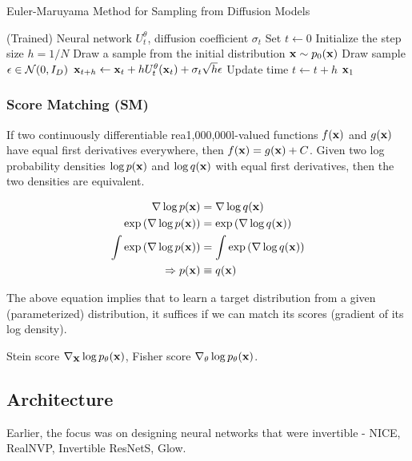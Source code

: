 \documentclass[a4paper, 11pt]{article}
\begin{document}
\begin{algorithm}
    \caption{Euler-Maruyama Method for Sampling from Diffusion Models \citep{sarkka2019applied}}\label{alg:diff_sample}
    \begin{algorithmic}[1]
    \Require (Trained) Neural network $U_t^{\theta}$, diffusion coefficient $\sigma_t$
    \State Set $t \gets 0$
    \State Initialize the step size $h = 1 / N$
    \State Draw a sample from the initial distribution $\mbox{$\mbox{$\mathbf{x}$}$} \sim p_0(\mbox{$\mbox{$\mathbf{x}$}$})$
    \State Draw sample $\epsilon \in \mbox{$\cal N$}(0, I_D)$
    \State $\mbox{$\mbox{$\mathbf{x}$}$}_{t+h} \gets \mbox{$\mbox{$\mathbf{x}$}$}_t + h U_t^{\theta}(\mbox{$\mbox{$\mathbf{x}$}$}_t) + \sigma_t \sqrt{h}\epsilon$
    \State Update time $t \gets t + h$
    \EndFor
    \State \Return $\mbox{$\mbox{$\mathbf{x}$}$}_1$
    \end{algorithmic}
\end{algorithm}


\subsubsection{Score Matching (SM)}
If two continuously differentiable rea1,000,000l-valued functions $f(\mbox{$\mbox{$\mathbf{x}$}$})$ and $g(\mbox{$\mbox{$\mathbf{x}$}$})$ have equal first derivatives everywhere, then $f(\mbox{$\mbox{$\mathbf{x}$}$}) = g(\mbox{$\mbox{$\mathbf{x}$}$}) + C$. Given two log probability densities $\log p(\mbox{$\mbox{$\mathbf{x}$}$})$ and $\log q(\mbox{$\mbox{$\mathbf{x}$}$})$ with equal first derivatives, then the two densities are equivalent.

\begin{align}
    \nabla \log p(\mbox{$\mbox{$\mathbf{x}$}$}) &= \nabla \log q(\mbox{$\mbox{$\mathbf{x}$}$}) \\ 
    \exp \left (\nabla \log p(\mbox{$\mbox{$\mathbf{x}$}$}) \right ) &= \exp \left (\nabla \log q(\mbox{$\mbox{$\mathbf{x}$}$}) \right) \\
    \int \exp \left (\nabla \log p(\mbox{$\mbox{$\mathbf{x}$}$}) \right ) &= \int \exp \left (\nabla \log q(\mbox{$\mbox{$\mathbf{x}$}$}) \right) \\ 
    \Rightarrow p(\mbox{$\mbox{$\mathbf{x}$}$}) &\equiv  q(\mbox{$\mbox{$\mathbf{x}$}$})
\end{align}

The above equation implies that to learn a target distribution from a given (parameterized) distribution, it suffices if we can match its scores (gradient of its log density).

Stein score $\nabla_{\mbox{$\mbox{$\mathbf{x}$}$}} \log p_{\theta}(\mbox{$\mbox{$\mathbf{x}$}$})$, Fisher score $\nabla_{\theta}\log p_{\theta}(\mbox{$\mbox{$\mathbf{x}$}$})$.

\subsection{Architecture}
Earlier, the focus was on designing neural networks that were invertible - NICE, RealNVP, Invertible ResNetS, Glow.
\end{document}
